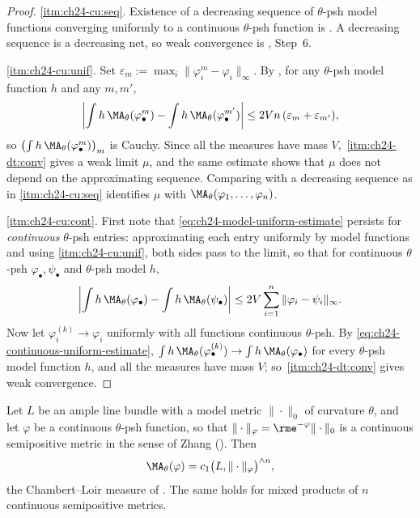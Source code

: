 \begin{proof}
\cref{itm:ch24-cu:seq}.  Existence of a decreasing sequence of \(\theta\)-psh
model functions converging uniformly to a continuous \(\theta\)-psh function
is .  A decreasing sequence is
a decreasing net, so weak convergence is
, Step~6.

\cref{itm:ch24-cu:unif}.  Set \(\varepsilon_m:=\max_i\|\varphi_i^m
-\varphi_i\|_\infty\).  By , for any
\(\theta\)-psh model function \(h\) and any \(m,m'\),
\[
 \left|\int h\,\MA_\theta(\varphi^m_\bullet)
      -\int h\,\MA_\theta(\varphi^{m'}_\bullet)\right|
 \leq 2Vn\,(\varepsilon_m+\varepsilon_{m'}),
\]
so \(\bigl(\int h\,\MA_\theta(\varphi^m_\bullet)\bigr)_m\) is Cauchy.  Since
all the measures have mass \(V\),
\,\cref{itm:ch24-dt:conv} gives a weak limit
\(\mu\), and the same estimate shows that \(\mu\) does not depend on the
approximating sequence.  Comparing with a decreasing sequence as in
\cref{itm:ch24-cu:seq} identifies \(\mu\) with
\(\MA_\theta(\varphi_1,\ldots,\varphi_n)\).

\cref{itm:ch24-cu:cont}.  First note that
\eqref{eq:ch24-model-uniform-estimate} persists for \emph{continuous}
\(\theta\)-psh entries: approximating each entry uniformly by model
functions and using \cref{itm:ch24-cu:unif}, both sides pass to the limit, so
that for continuous \(\theta\)-psh \(\varphi_\bullet,\psi_\bullet\) and
\(\theta\)-psh model \(h\),
\begin{equation}
\label{eq:ch24-continuous-uniform-estimate}
 \left|\int h\,\MA_\theta(\varphi_\bullet)
      -\int h\,\MA_\theta(\psi_\bullet)\right|
 \leq 2V\sum_{i=1}^{n}\|\varphi_i-\psi_i\|_\infty .
\end{equation}
Now let \(\varphi_i^{(k)}\to\varphi_i\) uniformly with all functions
continuous \(\theta\)-psh.  By \eqref{eq:ch24-continuous-uniform-estimate},
\(\int h\,\MA_\theta(\varphi^{(k)}_\bullet)\to
\int h\,\MA_\theta(\varphi_\bullet)\) for every \(\theta\)-psh model
function \(h\), and all the measures have mass \(V\); so
\,\cref{itm:ch24-dt:conv} gives weak convergence.
\end{proof}

\begin{corollary}
\label{cor:ch24-continuous-cl}
Let \(L\) be an ample line bundle with a model metric \(\|\cdot\|_0\) of
curvature \(\theta\), and let \(\varphi\) be a continuous \(\theta\)-psh
function, so that \(\|\cdot\|_\varphi=\rme^{-\varphi}\|\cdot\|_0\) is a
continuous semipositive metric in the sense of Zhang
().  Then
\[
 \MA_\theta(\varphi)=c_1\bigl(L,\|\cdot\|_\varphi\bigr)^{\wedge n},
\]
the Chambert--Loir measure of .  The same
holds for mixed products of \(n\) continuous semipositive metrics.
\end{corollary}

